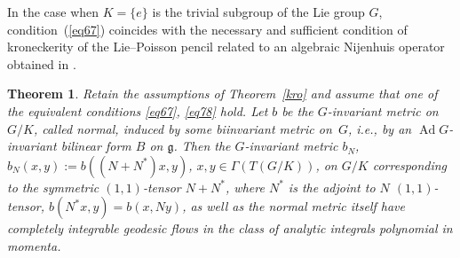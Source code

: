 \documentclass[10pt,a4paper]{amsart}
\numberwithin{equation}{section}
\newtheorem{Theorem}{Theorem}[section]
\begin{document}
\begin{Remark}\label{remarr} In the case when $K=\{e\}$ is the trivial subgroup of the Lie group $G$, condition~(\ref{eq67}) coincides with the necessary and sufficient condition of kroneckerity of the Lie--Poisson pencil related to an algebraic Nijenhuis operator obtained in \cite[Theorem~2.5]{p5}.
\end{Remark}

\begin{Theorem}\label{thgeod} Retain the assumptions of Theorem~{\rm \ref{kro}} and assume that one of the equivalent conditions \eqref{eq67}, \eqref{eq78} hold. Let $b$ be the $G$-invariant metric on $G/K$, called {\em normal}, induced by some biinvariant metric on~$G$, i.e., by an $\operatorname{Ad} G$-invariant bilinear form $B$ on $\mathfrak{g}$. Then the $G$-invariant metric $b_N$, $b_N(x,y):=b((N+N^*)x,y)$, $x,y\in \Gamma(T(G/K))$, on $G/K$ corresponding to the symmetric $(1,1)$-tensor $N+N^*$, where $N^*$ is the adjoint to $N$ $(1,1)$-tensor, $b(N^*x,y)=b(x,Ny)$, as well as the normal metric itself have completely integrable geodesic flows in the class of analytic integrals polynomial in momenta.
\end{Theorem}
\end{document}
